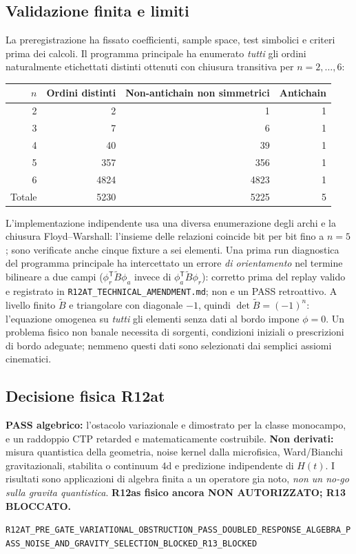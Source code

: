 \documentclass[11pt,a4paper]{article}
\begin{document}
\subsection{Validazione finita e limiti}
La preregistrazione ha fissato coefficienti, sample space, test simbolici e criteri
prima dei calcoli. Il programma principale ha enumerato \emph{tutti} gli ordini
naturalmente etichettati distinti ottenuti con chiusura transitiva per $n=2,\ldots,6$:
\begin{center}
\begin{tabular}{r r r r}
\toprule
$n$ & Ordini distinti & Non-antichain non simmetrici & Antichain \\
\midrule
2 & 2 & 1 & 1\\
3 & 7 & 6 & 1\\
4 & 40 & 39 & 1\\
5 & 357 & 356 & 1\\
6 & 4824 & 4823 & 1\\
\midrule
Totale & 5230 & 5225 & 5\\
\bottomrule
\end{tabular}
\end{center}
L'implementazione indipendente usa una diversa enumerazione degli archi e
la chiusura Floyd--Warshall: l'insieme delle relazioni coincide bit per bit
fino a $n=5$; sono verificate anche cinque fixture a sei elementi.
Una prima run diagnostica del programma principale ha intercettato un errore
\emph{di orientamento} nel termine bilineare a due campi ($\phi_r^{\mathsf T}
\widetilde B\phi_a$ invece di $\phi_a^{\mathsf T}\widetilde B\phi_r$):
corretto prima del replay valido e registrato in 
\texttt{R12AT\_TECHNICAL\_AMENDMENT.md}; non e un PASS retroattivo.
A livello finito $\widetilde B$ e triangolare con diagonale $-1$, quindi
$\det\widetilde B=(-1)^n$: l'equazione omogenea su \emph{tutti} gli elementi
senza dati al bordo impone $\phi=0$. Un problema fisico non banale necessita
di sorgenti, condizioni iniziali o prescrizioni di bordo adeguate; nemmeno
questi dati sono selezionati dai semplici assiomi cinematici.

\subsection{Decisione fisica R12at}
\textbf{PASS algebrico:} l'ostacolo variazionale e dimostrato per la classe
monocampo, e un raddoppio CTP retarded e matematicamente costruibile.
\textbf{Non derivati:} misura quantistica della geometria, noise kernel dalla
microfisica, Ward/Bianchi gravitazionali, stabilita o continuum 4d e
predizione indipendente di $H(t)$. I risultati sono applicazioni di algebra
finita a un operatore gia noto, \emph{non un no-go sulla gravita quantistica}.
\textbf{R12as fisico ancora NON AUTORIZZATO; R13 BLOCCATO.}
\begin{center}\small
\nolinkurl{R12AT_PRE_GATE_VARIATIONAL_OBSTRUCTION_PASS_DOUBLED_RESPONSE_ALGEBRA_PASS_NOISE_AND_GRAVITY_SELECTION_BLOCKED_R13_BLOCKED}
\end{center}
\end{document}
